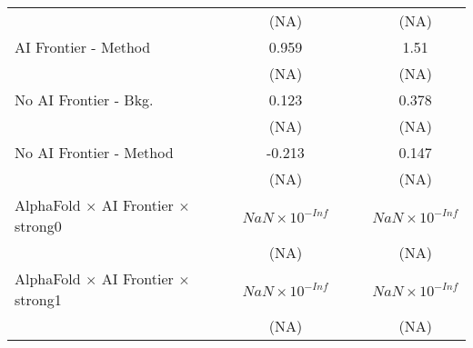 \begin{tabular}{lcccccc}
                                                                              &                        &                        & (NA)                   &                        &                        & (NA)\\   
   AI Frontier - Method                                                       &                        &                        & 0.959                  &                        &                        & 1.51\\   
                                                                              &                        &                        & (NA)                   &                        &                        & (NA)\\   
   No AI Frontier - Bkg.                                                      &                        &                        & 0.123                  &                        &                        & 0.378\\   
                                                                              &                        &                        & (NA)                   &                        &                        & (NA)\\   
   No AI Frontier - Method                                                    &                        &                        & -0.213                 &                        &                        & 0.147\\   
                                                                              &                        &                        & (NA)                   &                        &                        & (NA)\\   
   AlphaFold $\times$ AI Frontier $\times$ strong0                            &                        &                        & $NaN\times 10^{-Inf}$  &                        &                        & $NaN\times 10^{-Inf}$\\    
                                                                              &                        &                        & (NA)                   &                        &                        & (NA)\\   
   AlphaFold $\times$ AI Frontier $\times$ strong1                            &                        &                        & $NaN\times 10^{-Inf}$  &                        &                        & $NaN\times 10^{-Inf}$\\    
                                                                              &                        &                        & (NA)                   &                        &                        & (NA)\\   

\end{tabular}
